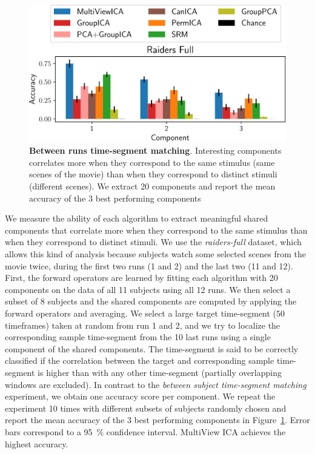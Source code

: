 \begin{figure}
  \centering
  \includegraphics[width=\textwidth]{figures/mvica/swetha_exp_full_fit.pdf}
  \caption{\textbf{Between runs time-segment matching}. Interesting components correlates more when they correspond to the same stimulus (same scenes of the movie) than when they correspond to distinct stimuli (different scenes).
  We extract 20 components and report the mean accuracy of the 3 best performing components}
  \label{fig:swetha}
\end{figure}

We measure the ability of each algorithm to extract meaningful shared components that correlate more when they correspond to the same stimulus than when they correspond to distinct stimuli. We use the \emph{raiders-full} dataset, which allows this kind of analysis because subjects watch some selected scenes from the movie twice, during the first two runs (1 and 2) and the last two (11 and 12).
%
First, the forward operators are learned by fitting each algorithm with 20 components on the data of all 11 subjects using all 12 runs. We then select a subset of 8 subjects and the shared components are computed by applying the forward operators and averaging.
%
We select a large target time-segment ($50$
timeframes) taken at random from run 1 and 2, and we try to localize the corresponding sample time-segment from the 10 last runs using a single component of the shared components.
%
The time-segment is said to be
correctly classified if the correlation between the target and corresponding sample
time-segment is higher than with any other time-segment (partially overlapping windows are excluded).
%
In contrast to the \emph{between subject time-segment matching} experiment, we obtain one accuracy score per component.
%
We repeat the experiment 10 times with different subsets of subjects randomly chosen and report the mean accuracy of the 3 best performing components in Figure~\ref{fig:swetha}. Error bars correspond to a 95~\% confidence interval.
%
MultiView ICA achieves the highest accuracy.

